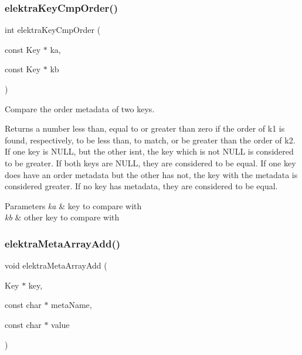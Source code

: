 \subsubsection{\texorpdfstring{elektraKeyCmpOrder()}{elektraKeyCmpOrder()}}
{\footnotesize\ttfamily int elektra\+Key\+Cmp\+Order (\begin{DoxyParamCaption}\item[{const Key $\ast$}]{ka,  }\item[{const Key $\ast$}]{kb }\end{DoxyParamCaption})}



Compare the order metadata of two keys. 

\begin{DoxyReturn}{Returns}
a number less than, equal to or greater than zero if the order of k1 is found, respectively, to be less than, to match, or be greater than the order of k2. If one key is N\+U\+LL, but the other isn\textquotesingle{}t, the key which is not N\+U\+LL is considered to be greater. If both keys are N\+U\+LL, they are considered to be equal. If one key does have an order metadata but the other has not, the key with the metadata is considered greater. If no key has metadata, they are considered to be equal.
\end{DoxyReturn}

\begin{DoxyParams}{Parameters}
{\em ka} & key to compare with \\
\hline
{\em kb} & other key to compare with \\
\hline
\end{DoxyParams}
\mbox{\label{group__meta_ga166c65c4eb2d758ced57b0bd74fb9a57}} 
\subsubsection{\texorpdfstring{elektraMetaArrayAdd()}{elektraMetaArrayAdd()}}
{\footnotesize\ttfamily void elektra\+Meta\+Array\+Add (\begin{DoxyParamCaption}\item[{Key $\ast$}]{key,  }\item[{const char $\ast$}]{meta\+Name,  }\item[{const char $\ast$}]{value }\end{DoxyParamCaption})}



